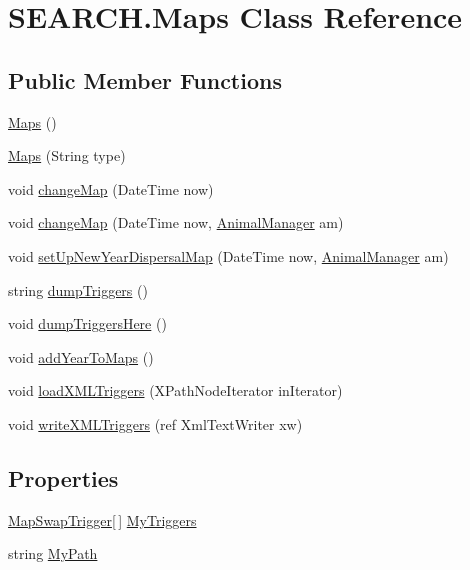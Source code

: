 \hypertarget{class_s_e_a_r_c_h_1_1_maps}{\section{S\-E\-A\-R\-C\-H.\-Maps Class Reference}
\label{class_s_e_a_r_c_h_1_1_maps}
}
\subsection*{Public Member Functions}
\begin{DoxyCompactItemize}
\item 
\hyperlink{class_s_e_a_r_c_h_1_1_maps_a381312814c8f1da64c9b9f7511c0a211}{Maps} ()
\item 
\hyperlink{class_s_e_a_r_c_h_1_1_maps_a3d4d30735a851b580186df09faef708f}{Maps} (String type)
\item 
void \hyperlink{class_s_e_a_r_c_h_1_1_maps_ada59f2a285b20740b1c1712b3a660062}{change\-Map} (Date\-Time now)
\item 
void \hyperlink{class_s_e_a_r_c_h_1_1_maps_a44d2fe28fb19d96313af4009d7f06d9d}{change\-Map} (Date\-Time now, \hyperlink{class_s_e_a_r_c_h_1_1_animal_manager}{Animal\-Manager} am)
\item 
void \hyperlink{class_s_e_a_r_c_h_1_1_maps_acf2d909ac94d15a1a5bd5914adbf2e0c}{set\-Up\-New\-Year\-Dispersal\-Map} (Date\-Time now, \hyperlink{class_s_e_a_r_c_h_1_1_animal_manager}{Animal\-Manager} am)
\item 
string \hyperlink{class_s_e_a_r_c_h_1_1_maps_adb1ce6ccbd9671966cb4be8492b10087}{dump\-Triggers} ()
\item 
void \hyperlink{class_s_e_a_r_c_h_1_1_maps_aa31a22fd440ee97c4c467967b776eff0}{dump\-Triggers\-Here} ()
\item 
void \hyperlink{class_s_e_a_r_c_h_1_1_maps_a032f2416a193b3793d5ed4f8439e9479}{add\-Year\-To\-Maps} ()
\item 
void \hyperlink{class_s_e_a_r_c_h_1_1_maps_a5f2ee78f4d63a94b45646ba2b199bb0e}{load\-X\-M\-L\-Triggers} (X\-Path\-Node\-Iterator in\-Iterator)
\item 
void \hyperlink{class_s_e_a_r_c_h_1_1_maps_a6192ea1e8fec05183e79def380a79e57}{write\-X\-M\-L\-Triggers} (ref Xml\-Text\-Writer xw)
\end{DoxyCompactItemize}
\subsection*{Properties}
\begin{DoxyCompactItemize}
\item 
\hyperlink{class_s_e_a_r_c_h_1_1_map_swap_trigger}{Map\-Swap\-Trigger}\mbox{[}$\,$\mbox{]} \hyperlink{class_s_e_a_r_c_h_1_1_maps_a198b4e31a5fe24752d57a58ef4850110}{My\-Triggers}
\item 
string \hyperlink{class_s_e_a_r_c_h_1_1_maps_a544f110188e5e80b14d13d0ce94e1829}{My\-Path}
\end{DoxyCompactItemize}


